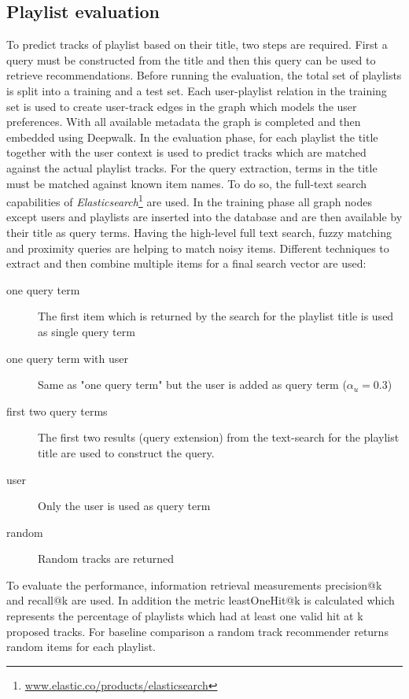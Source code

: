 \documentclass[sigconf]{acmart}
\begin{document}
\subsection{Playlist evaluation}
\label{subsec:playlist_eval}
To predict tracks of playlist based on their title, two steps are required. First a query must be constructed from the title and then this query can be used to retrieve recommendations. Before running the evaluation, the total set of playlists is split into a training and a test set. Each user-playlist relation in the training set is used to create user-track edges in the graph which models the user preferences. With all available metadata the graph is completed and then embedded using Deepwalk. In the evaluation phase, for each playlist the title together with the user context is used to predict tracks which are matched against the actual playlist tracks. For the query extraction, terms in the title must be matched against known item names. To do so, the full-text search capabilities of \emph{Elasticsearch}\footnote{\url{www.elastic.co/products/elasticsearch}} are used. In the training phase all graph nodes except users and playlists are inserted into the database and are then available by their title as query terms. Having the high-level full text search, fuzzy matching and proximity queries are helping to match noisy items. Different techniques to extract and then combine multiple items for a final search vector are used:

\begin{description}
	\item[one query term] The first item which is returned by the search for the playlist title is used as single query term
	\item[one query term with user] Same as "one query term" but the user is added as query term ($ \alpha_{u} = 0.3 $)
	\item[first two query terms] The first two results (query extension) from the text-search for the playlist title are used to construct the query.
	\item[user] Only the user is used as query term
	\item[random] Random tracks are returned
\end{description}


To evaluate the performance, information retrieval measurements precision@k and recall@k are used. In addition the metric leastOneHit@k is calculated which represents the percentage of playlists which had at least one valid hit at k proposed tracks. For baseline comparison a random track recommender returns random items for each playlist.
\end{document}
